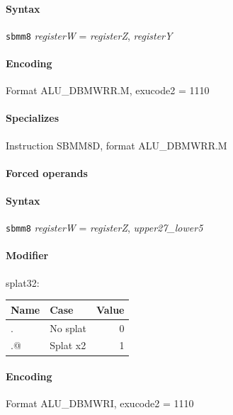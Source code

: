 {\paragraph{Syntax} \texttt{sbmm8} \emph{registerW} = \emph{registerZ}, \emph{registerY}

\paragraph{Encoding} Format \textsf{ALU\_DBMWRR.M, exucode2 = 1110}\\



\paragraph{Specializes} Instruction SBMM8D, format ALU\_DBMWRR.M

\paragraph{Forced operands} 

\paragraph{Syntax} \texttt{sbmm8} \emph{registerW} = \emph{registerZ}, \emph{upper27\_lower5}

\paragraph{Modifier} \textsf{splat32}:\\

\noindent \begin{tabular}{|l|l|r|} \hline
\bf{Name} & \bf{Case} & \bf{Value} \\ \hline
. & No splat & 0 \\
.@ & Splat x2 & 1 \\
\hline \end{tabular}

\paragraph{Encoding} Format \textsf{ALU\_DBMWRI, exucode2 = 1110}\\



}
